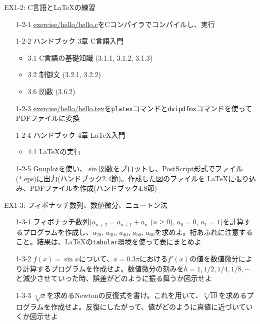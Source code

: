 \documentclass[dvipdfmx]{beamer}
\begin{document}
\begin{frame}[t,fragile]{EX1-2: C言語と\LaTeX の練習}
  \begin{itemize}
  \item[1-2-1] \href{https://github.com/todo-group/computer-experiments/exercise/hello/hello.c}{exercise/hello/hello.c}をCコンパイラでコンパイルし、実行
  \item[1-2-2] ハンドブック 3章 C言語入門
    \begin{itemize}
    \item 3.1 C言語の基礎知識 (3.1.1, 3.1.2, 3.1.3)
    \item 3.2 制御文 (3.2.1, 3.2.2)
    \item 3.6 関数 (3.6.2)
    \end{itemize}
  \item[1-2-3] \href{https://github.com/todo-group/computer-experiments/exercise/hello/hello.tex}{exercise/hello/hello.tex}を{\tt platex}コマンドと{\tt dvipdfmx}コマンドを使ってPDFファイルに変換
  \item[1-2-4] ハンドブック 4章 \LaTeX 入門
    \begin{itemize}
    \item 4.1 \LaTeX の実行
    \end{itemize}
  \item[1-2-5] Gnuplotを使い、$\sin$関数をプロットし、PostScript形式でファイル(*.eps)に出力(ハンドブック2.4節)。作成した図のファイルを \LaTeX に張り込み、PDFファイルを作成(ハンドブック4.8節)
  \end{itemize}
\end{frame}

\begin{frame}[t,fragile]{EX1-3: フィボナッチ数列、数値微分、ニュートン法}
  \begin{itemize}
    \setlength{\itemsep}{1em}
  \item[1-3-1] フィボナッチ数列($a_{n+2}=a_{n+1}+a_n$ ($n \ge 0$), $a_0=0$, $a_1=1$)を計算するプログラムを作成し、$a_{20}$, $a_{30}$, $a_{40}$, $a_{50}$, $a_{60}$を求めよ。桁あふれに注意すること。結果は、\LaTeX の{\tt tabular}環境を使って表にまとめよ
  \item[1-3-2] $f(x)=\sin x$について、$x=0.3\pi$における$f'(x)$の値を数値微分により計算するプログラムを作成せよ。数値微分の刻みを$h=1,1/2,1/4,1/8,\cdots$と減少させていった時、誤差がどのように振る舞うか図示せよ
  \item[1-3-3] $\sqrt[3]{x}$を求めるNewtonの反復式を書け。これを用いて、$\sqrt[3]{10}$を求めるプログラムを作成せよ。反復にしたがって、値がどのように真値に近づいていくか図示せよ
  \end{itemize}    
\end{frame}
\end{document}
